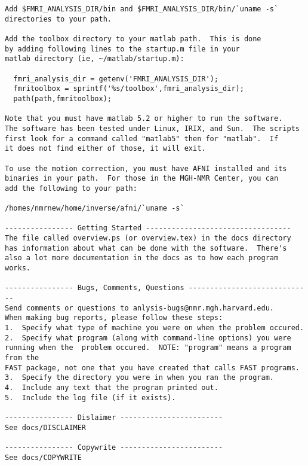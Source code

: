 \documentclass[10pt]{article}
\begin{document}
\begin{verbatim}
Add $FMRI_ANALYSIS_DIR/bin and $FMRI_ANALYSIS_DIR/bin/`uname -s` 
directories to your path.

Add the toolbox directory to your matlab path.  This is done
by adding following lines to the startup.m file in your 
matlab directory (ie, ~/matlab/startup.m):

  fmri_analysis_dir = getenv('FMRI_ANALYSIS_DIR');
  fmritoolbox = sprintf('%s/toolbox',fmri_analysis_dir);
  path(path,fmritoolbox);

Note that you must have matlab 5.2 or higher to run the software.
The software has been tested under Linux, IRIX, and Sun.  The scripts
first look for a command called "matlab5" then for "matlab".  If
it does not find either of those, it will exit.

To use the motion correction, you must have AFNI installed and its
binaries in your path.  For those in the MGH-NMR Center, you can
add the following to your path:

/homes/nmrnew/home/inverse/afni/`uname -s`

---------------- Getting Started ---------------------------------- 
The file called overview.ps (or overview.tex) in the docs directory
has information about what can be done with the software.  There's
also a lot more documentation in the docs as to how each program
works.

---------------- Bugs, Comments, Questions ----------------------------- 
Send comments or questions to anlysis-bugs@nmr.mgh.harvard.edu.
When making bug reports, please follow these steps:
1.  Specify what type of machine you were on when the problem occured.
2.  Specify what program (along with command-line options) you were
running when the  problem occured.  NOTE: "program" means a program from the
FAST package, not one that you have created that calls FAST programs.
3.  Specify the directory you were in when you ran the program. 
4.  Include any text that the program printed out. 
5.  Include the log file (if it exists).

---------------- Dislaimer ------------------------
See docs/DISCLAIMER

---------------- Copywrite ------------------------
See docs/COPYWRITE
\end{verbatim}
\end{document}
